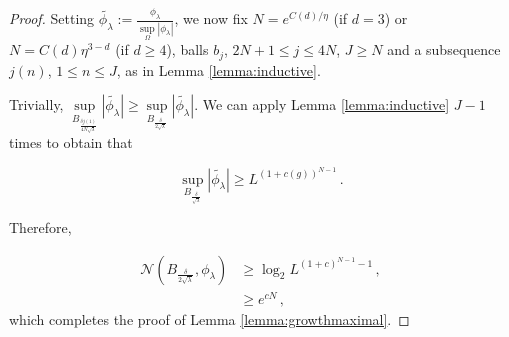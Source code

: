 \documentclass[10pt,a4paper]{amsart}
\begin{document}
\begin{proof}
Setting $\widetilde{\phi_\lambda} := \frac{\phi_\lambda}{ \sup\limits_\Omega|\phi_{\lambda}|}$, we now fix $N = e^{C(d)/\eta}$ (if $d=3$) or $N= C(d) \eta^{3-d}$ (if $d \geq 4$), balls $b_j$, $2N+1 \leq j \leq 4N$, $J \geq N$ and a subsequence $j(n)$, $1 \leq n \leq J$, as in Lemma \ref{lemma:inductive}.

Trivially, $\sup\limits_{B_{\frac{\delta j(1)}{4N \sqrt{\lambda}}}} |\widetilde{\phi_\lambda}| \geq \sup\limits_{B_{\frac{\delta}{2\sqrt{\lambda}}}} |\widetilde{\phi_\lambda}|$. We can apply Lemma \ref{lemma:inductive} $J-1$ times to obtain that 

\begin{equation}
    \sup\limits_{B_{\frac{\delta}{\sqrt{\lambda}}}} |\widetilde{\phi_\lambda}| \geq L^{(1+c(g))^{N-1}}  \, .
\end{equation}

Therefore, 

\begin{align}\label{eq:lowerbounddoubling}
    \mathcal{N}(B_{\frac{\delta}{2\sqrt{\lambda}}},\phi_{\lambda}) &\geq \log_2 L^{{(1+c)}^{N-1}-1}\, ,\\
    &\geq e^{cN} \, ,
\end{align}
which completes the proof of Lemma \ref{lemma:growthmaximal}.
\end{proof}
\end{document}
